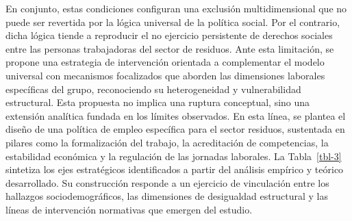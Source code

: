 \documentclass[
  spanish,
  11pt,
  a4paper,
]{scrbook}
\begin{document}
En conjunto, estas condiciones configuran una exclusión multidimensional
que no puede ser revertida por la lógica universal de la política
social. Por el contrario, dicha lógica tiende a reproducir el no
ejercicio persistente de derechos sociales entre las personas
trabajadoras del sector de residuos. Ante esta limitación, se propone
una estrategia de intervención orientada a complementar el modelo
universal con mecanismos focalizados que aborden las dimensiones
laborales específicas del grupo, reconociendo su heterogeneidad y
vulnerabilidad estructural. Esta propuesta no implica una ruptura
conceptual, sino una extensión analítica fundada en los límites
observados. En esta línea, se plantea el diseño de una política de
empleo específica para el sector residuos, sustentada en pilares como la
formalización del trabajo, la acreditación de competencias, la
estabilidad económica y la regulación de las jornadas laborales. La
Tabla~\ref{tbl-3} sintetiza los ejes estratégicos identificados a partir
del análisis empírico y teórico desarrollado. Su construcción responde a
un ejercicio de vinculación entre los hallazgos sociodemográficos, las
dimensiones de desigualdad estructural y las líneas de intervención
normativas que emergen del estudio.

\begingroup
\scriptsize
\end{document}

